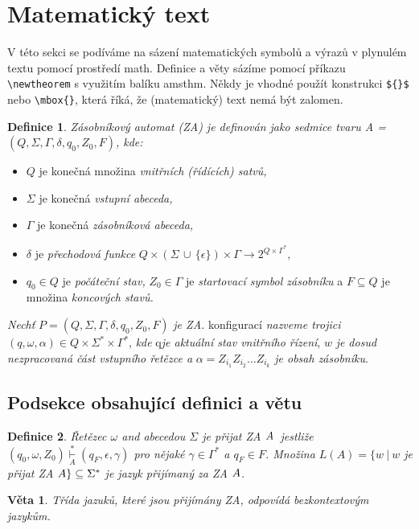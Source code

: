 \documentclass[twocolumn, 11pt, a4paper]{article}[16.03.2023]
\newtheorem{definition}{Definice}
\newtheorem{sentence}{Věta}
\begin{document}
\section{Matematický text}
V této sekci se podíváme na sázení matematických symbolů a výrazů v plynulém 
textu pomocí prostředí math. 
Definice a věty sázíme pomocí příkazu \verb|\newtheorem| s využitím balíku amsthm. 
Někdy je vhodné použít konstrukci \verb|${}$| nebo \verb|\mbox{}|, která říká, že (matematický) text 
nemá být zalomen.
\begin{definition}
    \emph{Zásobníkový automat} (ZA) je definován jako sedmice tvaru A = $\left(Q, \Sigma, \Gamma, \delta, q_0, Z_0, F\right)$, kde: \label{Definice}
\end{definition}
        \begin{itemize} 
            \item $Q$ je konečná množina \emph{vnitřních (řídících) satvů,}
            \item $\Sigma$ je konečná \emph{vstupní abeceda,}
            \item $\Gamma$ je konečná \emph{zásobníková abeceda,}
            \item $\delta$ je \emph{přechodová funkce} $Q \times (\Sigma\,\cup\,\{\epsilon\})\times\Gamma\rightarrow2^{Q\times\Gamma^\ast},$
            \item $q_0 \in Q$ je \emph{počáteční stav,} $Z_0 \in \Gamma$ je \emph{startovací symbol zásobníku} a $F \subseteq Q$ je množina \emph{koncových stavů.} 
        \end{itemize}

     \emph{Nechť} $P=(Q,\Sigma,\Gamma,\delta,q_0,Z_0,F)$ \emph{je ZA.} konfigurací \emph{nazveme
        trojici} $(q,\omega,\alpha) \in Q\times\Sigma^{\ast}\times\Gamma^{\ast}$, \emph{kde} q\emph{je aktuální 
        stav vnitřního řízení}, $w$ \emph{je dosud nezpracovaná část vstupního řetězce a} $\alpha=Z_{i_1}Z_{i_2}\dots Z_{i_k}$ \emph{je obsah zásobníku}.

    \subsection{Podsekce obsahující definici a větu}
    \begin{definition}
        \emph{Řetězec $\omega$ and abecedou $\Sigma$ je přijat ZA} $\mathnormal{A}$~jestliže $(q_0,\omega,Z_0) \underset{A}{\overset{\ast}{\vdash}} (q_F,\epsilon,\gamma)$ pro nějaké $\gamma\in\Gamma^\ast$ a $q_F\in F$.
        Množina $L(A)=\{w\ |\ w$ je přijat ZA $\mathnormal{A}\} \subseteq \Sigma^\ast$ je \emph{jazyk přijímaný za ZA} $\mathnormal{A}$.
    \end{definition}
    \begin{sentence}
        Třída jazuků, které jsou přijímány ZA, odpovídá \emph{bezkontextovým jazykům}.
    \end{sentence}
\end{document}
